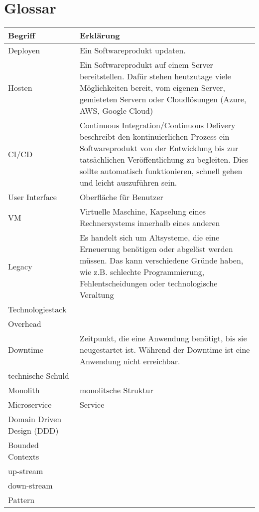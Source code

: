 \section{Glossar}
\begin{center}
	\begin{tabular}{lp{10cm}}
		Begriff & Erklärung \\ \hline
		Deployen & Ein Softwareprodukt updaten.  \\
		Hosten & Ein Softwareprodukt auf einem Server bereitstellen. Dafür stehen heutzutage viele Möglichkeiten bereit, vom eigenen Server, gemieteten Servern oder Cloudlösungen (Azure, AWS, Google Cloud) \\
		CI/CD & Continuous Integration/Continuous Delivery beschreibt den kontinuierlichen Prozess ein Softwareprodukt von der Entwicklung bis zur tatsächlichen Veröffentlichung zu begleiten. Dies sollte automatisch funktionieren, schnell gehen und leicht auszuführen sein.  \\
		User Interface  & Oberfläche für Benutzer  \\
		VM & Virtuelle Maschine, Kapselung eines Rechnersystems innerhalb eines anderen  \\
		Legacy & Es handelt sich um Altsysteme, die eine Erneuerung benötigen oder abgelöst werden müssen. Das kann verschiedene Gründe haben, wie z.B. schlechte Programmierung, Fehlentscheidungen oder technologische Veraltung   \\
		Technologiestack &   \\
		Overhead &   \\
		Downtime & Zeitpunkt, die eine Anwendung benötigt, bis sie neugestartet ist. Während der Downtime ist eine Anwendung nicht erreichbar.  \\
		technische Schuld &   \\
		Monolith & monolitsche Struktur \\
		Microservice & Service  \\	
		Domain Driven Design (DDD) &  \\	
		Bounded Contexts & \\
		up-stream & \\
		down-stream & \\
		Pattern & \\
	\end{tabular}
\end{center}
